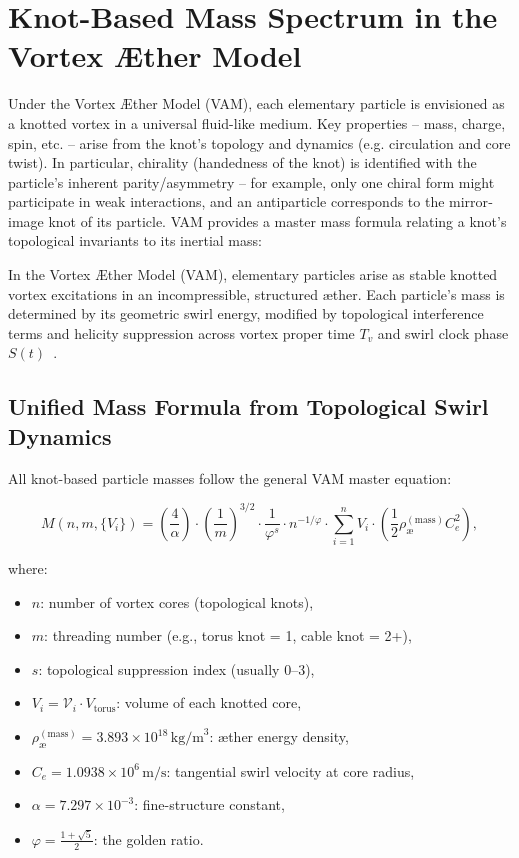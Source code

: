 
\section{Knot-Based Mass Spectrum in the Vortex \AE{}ther Model}
\label{sec:knot_particle_mapping}

Under the Vortex Æther Model (VAM), each elementary particle is envisioned as a knotted vortex in a universal fluid-like medium. Key properties – mass, charge, spin, etc. – arise from the knot’s topology and dynamics (e.g. circulation and core twist). In particular, chirality (handedness of the knot) is identified with the particle’s inherent parity/asymmetry – for example, only one chiral form might participate in weak interactions, and an antiparticle corresponds to the mirror‐image knot of its particle. VAM provides a master mass formula relating a knot’s topological invariants to its inertial mass:

In the Vortex \AE{}ther Model (VAM), elementary particles arise as stable knotted vortex excitations in an incompressible, structured æther. Each particle's mass is determined by its geometric swirl energy, modified by topological interference terms and helicity suppression across vortex proper time \(T_v\) and swirl clock phase \(S(t)\)~\cite{Iskandarani2025StandardModel, Iskandarani2025Timedilation}.

\subsection{Unified Mass Formula from Topological Swirl Dynamics}

All knot-based particle masses follow the general VAM master equation:

\begin{equation}
M(n, m, \{V_i\}) = \left( \frac{4}{\alpha} \right) \cdot \left( \frac{1}{m} \right)^{3/2} \cdot \frac{1}{\varphi^s} \cdot n^{-1/\varphi} \cdot \sum_{i=1}^{n} V_i \cdot \left( \frac{1}{2} \rho_\text{\ae}^{(\text{mass})} C_e^2 \right),
\label{eq:mass_master}
\end{equation}

where:
\begin{itemize}
  \item \(n\): number of vortex cores (topological knots),
  \item \(m\): threading number (e.g., torus knot = 1, cable knot = 2+),
  \item \(s\): topological suppression index (usually 0–3),
  \item \(V_i = \mathcal{V}_i \cdot V_{\text{torus}}\): volume of each knotted core,
  \item \(\rho_\text{\ae}^{(\text{mass})} = 3.893 \times 10^{18}\,\text{kg/m}^3\): æther energy density,
  \item \(C_e = 1.0938 \times 10^6\,\text{m/s}\): tangential swirl velocity at core radius,
  \item \(\alpha = 7.297\times 10^{-3}\): fine-structure constant,
  \item \(\varphi = \frac{1+\sqrt{5}}{2}\): the golden ratio.
\end{itemize}

